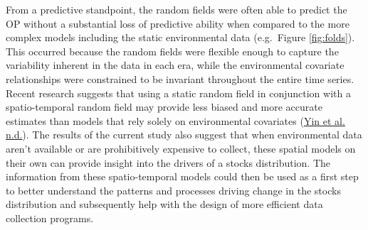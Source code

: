 \documentclass[
]{article}
\begin{document}
From a predictive standpoint, the random fields were often able to predict the OP without a substantial loss of predictive ability when compared to the more complex models including the static environmental data (e.g.~Figure \ref{fig:folds}). This occurred because the random fields were flexible enough to capture the variability inherent in the data in each era, while the environmental covariate relationships were constrained to be invariant throughout the entire time series. Recent research suggests that using a static random field in conjunction with a spatio-temporal random field may provide less biased and more accurate estimates than models that rely solely on environmental covariates (\protect\hyperlink{ref-yinReviewSpatiotemporalModel}{Yin et al. n.d.}). The results of the current study also suggest that when environmental data aren't available or are prohibitively expensive to collect, these spatial models on their own can provide insight into the drivers of a stocks distribution. The information from these spatio-temporal models could then be used as a first step to better understand the patterns and processes driving change in the stocks distribution and subsequently help with the design of more efficient data collection programs.
\end{document}
